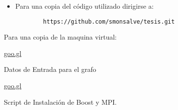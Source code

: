 
\begin{itemize}
	\item Para una copia del código utilizado dirigirse a: 

	\begin{verbatim}
		https://github.com/smonsalve/tesis.git
	\end{verbatim}
	
\end{itemize}



Para una copia de la maquina virtual:

\url{goo.gl}



Datos de Entrada para el grafo

\url{goo.gl}
		

Script de Instalación de Boost y MPI.

